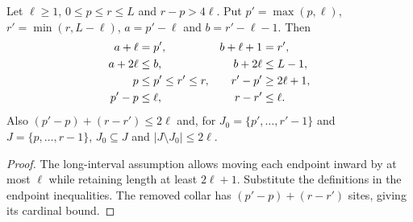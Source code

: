 \begin{lemma}
    \label{thm:inward_effective_cuts}
    \leanok
    Let $\ell\ge1$, $0\le p\le r\le L$ and $r-p>4\ell$.
    Put $p'=\max(p,\ell)$, $r'=\min(r,L-\ell)$,
    $a=p'-\ell$ and $b=r'-\ell-1$. Then
    \begin{align}
        a+\ell  & =p',               & b+\ell+1 & =r',\notag        \\
        a+2\ell & \le b,             & b+2\ell  & \le L-1,\notag    \\
        p       & \le p'\le r'\le r, & r'-p'    & \ge2\ell+1,\notag \\
        p'-p    & \le\ell,           & r-r'     & \le\ell.
    \end{align}
    Also $(p'-p)+(r-r')\le2\ell$ and, for
    $J_0=\{p',\ldots,r'-1\}$ and $J=\{p,\ldots,r-1\}$,
    $J_0\subseteq J$ and $|J\setminus J_0|\le2\ell$.
\end{lemma}
\begin{proof}
    \leanok
    The long-interval assumption allows moving each endpoint inward by at
    most $\ell$ while retaining length at least $2\ell+1$.
    Substitute the definitions in the endpoint inequalities. The removed
    collar has $(p'-p)+(r-r')$ sites, giving its cardinal bound.
\end{proof}
